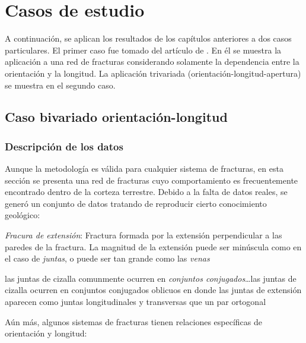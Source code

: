 \chapter{Casos de estudio}
\label{ch7:examples}

A continuaci\'on, se aplican los resultados de los cap\'itulos anteriores a dos casos particulares.
El primer caso fue tomado del art\'iculo de \citet{mendoza-torres_bernstein_2017}. 
En \'el se muestra la aplicaci\'on a una red de fracturas considerando solamente la dependencia entre la orientaci\'on y la longitud.
La aplicaci\'on trivariada (orientaci\'on-longitud-apertura) se muestra en el segundo caso.

\section{Caso bivariado orientaci\'on-longitud}

\subsection{Descripci\'on de los datos}
\label{ss:synthData}

Aunque la metodolog\'ia es v\'alida para cualquier sistema de fracturas, en esta secci\'on se presenta una red de fracturas cuyo comportamiento es frecuentemente encontrado dentro de la corteza terrestre. Debido a la falta de datos reales, se gener\'o un conjunto de datos tratando de reproducir cierto conocimiento geol\'ogico:

\setlength{\epigraphwidth}{0.9\textwidth}
\epigraph{\textit{Fracura de extensi\'on}: Fractura formada por la extensi\'on perpendicular a las paredes de la fractura. La magnitud de la extensi\'on puede ser min\'uscula como en el caso de 
\textit{juntas}, o puede ser tan grande como las \textit{venas}}{\citet[p. 434]{fossen_structural_2010}}

\setlength{\epigraphwidth}{0.9\textwidth}
\epigraph{las juntas de cizalla comunmente ocurren en \textit{conjuntos conjugados}\ldots las juntas de cizalla ocurren en conjuntos conjugados oblicuos en donde las juntas de extensi\'on aparecen como juntas longitudinales y transversas que un par ortogonal}{\citet[p. 17]{singhal_applied_2010}}

A\'un m\'as, algunos sistemas de fracturas tienen relaciones espec\'ificas de orientaci\'on y longitud:

